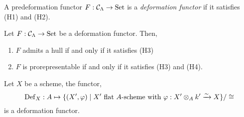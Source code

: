 \documentclass[12pt]{article}
\begin{document}
\begin{defn}
A predeformation functor $F : \mathcal{C}_{\Lambda} \to \mathrm{Set}$ is a \textit{deformation functor} if it satisfies (H1) and (H2).
\end{defn}

\begin{theorem}[Schlessinger]
Let $F : \mathcal{C}_{\Lambda} \to \mathrm{Set}$ be a deformation functor. Then,
\begin{enumerate}
\item $F$ admits a hull if and only if it satisfies (H3)
\item $F$ is prorepresentable if and only if it satisfies (H3) and (H4).
\end{enumerate}
\end{theorem}

\begin{example}
Let $X$ be a scheme, the functor,
\[ \mathrm{Def}_X : A \mapsto \{ (X', \varphi) \mid X' \text{ flat } A\text{-scheme with } \varphi : X' \otimes_A k' \xrightarrow{\sim} X \} / \cong \]
is a deformation functor. 
\end{example}
\end{document}
